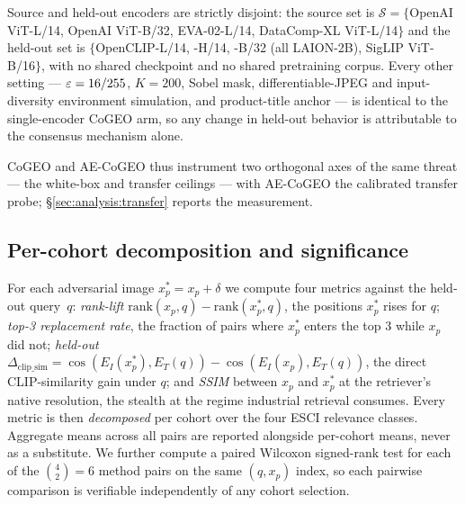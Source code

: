 Source and held-out encoders are strictly disjoint: the source set is $\mathcal{S}=\{$OpenAI ViT-L/14, OpenAI ViT-B/32, EVA-02-L/14, DataComp-XL ViT-L/14$\}$ and the held-out set is $\{$OpenCLIP-L/14, -H/14, -B/32 (all LAION-2B), SigLIP ViT-B/16$\}$, with no shared checkpoint and no shared pretraining corpus. Every other setting --- $\varepsilon=16/255$, $K=200$, Sobel mask, differentiable-JPEG and input-diversity environment simulation, and product-title anchor --- is identical to the single-encoder CoGEO arm, so any change in held-out behavior is attributable to the consensus mechanism alone.

CoGEO and AE-CoGEO thus instrument two orthogonal axes of the same threat --- the white-box and transfer ceilings --- with AE-CoGEO the calibrated transfer probe; \S\ref{sec:analysis:transfer} reports the measurement.

\subsection{Per-cohort decomposition and significance}
\label{sec:method:metrics}

For each adversarial image $x_p^* = x_p + \delta$ we compute four metrics against the held-out query~$q$: \emph{rank-lift} $\mathrm{rank}(x_p, q) - \mathrm{rank}(x_p^*, q)$, the positions $x_p^*$ rises for $q$; \emph{top-3 replacement rate}, the fraction of pairs where $x_p^*$ enters the top $3$ while $x_p$ did not; \emph{held-out} $\Delta_{\mathrm{clip\_sim}} = \cos(E_I(x_p^*), E_T(q)) - \cos(E_I(x_p), E_T(q))$, the direct CLIP-similarity gain under $q$; and \emph{SSIM} between $x_p$ and $x_p^*$ at the retriever's native resolution, the stealth at the regime industrial retrieval consumes. Every metric is then \emph{decomposed} per cohort over the four ESCI relevance classes. Aggregate means across all pairs are reported alongside per-cohort means, never as a substitute. We further compute a paired Wilcoxon signed-rank test for each of the $\binom{4}{2}=6$ method pairs on the same $(q, x_p)$ index, so each pairwise comparison is verifiable independently of any cohort selection.


